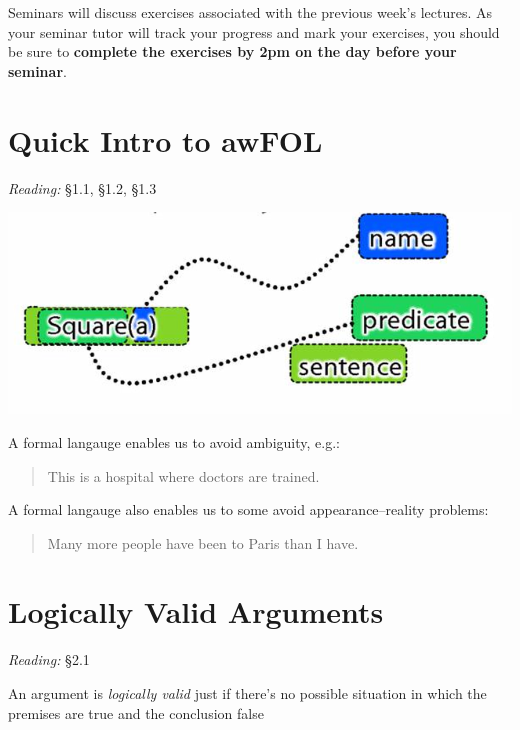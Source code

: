 \documentclass[12pt]{extarticle}
\begin{document}
\begin{multicols*}{3}
Seminars will discuss exercises associated with the previous week’s lectures. As your seminar tutor will track your progress and mark your exercises, you should be sure to \textbf{complete the exercises by 2pm on the day before your seminar}.
 
 
 
 
\section{Quick Intro to awFOL}
 
\emph{Reading:} §1.1, §1.2, §1.3
 
 
\begin{center}
\includegraphics[scale=0.3]{img/name_predicate_sentence.png}
\end{center}
A formal langauge enables us to avoid ambiguity, e.g.:
 
\begin{quote}
 
This is a hospital where doctors are trained.
 
\end{quote}
 
A formal langauge also enables us to some avoid appearance--reality problems:
 
\begin{quote}
 
Many more people have been to Paris than I have.
 
\end{quote}
 
 
 
 
 
\section{Logically Valid Arguments}
 
\emph{Reading:} §2.1
 
An argument is \emph{logically valid} just if there’s no possible situation in which the premises are true and the conclusion false
 

\end{multicols*}
\end{document}
